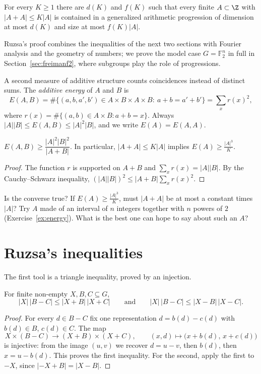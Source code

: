 \begin{theorem}\label{thm:freiman}
For every $K\ge1$ there are $d(K)$ and $f(K)$ such that every finite $A\subset\Z$ with $|A+A|\le K|A|$ is contained in a generalized arithmetic progression of dimension at most $d(K)$ and size at most $f(K)|A|$.
\end{theorem}

Ruzsa's proof combines the inequalities of the next two sections with Fourier analysis and the geometry of numbers; we prove the model case $G=\mathbb F_2^n$ in full in Section~\ref{sec:freimanf2}, where subgroups play the role of progressions.

A second measure of additive structure counts coincidences instead of distinct sums. The \emph{additive energy} of $A$ and $B$ is
\[
E(A,B)=\#\{(a,b,a',b')\in A\times B\times A\times B:\ a+b=a'+b'\}=\sum_xr(x)^2,
\]
where $r(x)=\#\{(a,b)\in A\times B:a+b=x\}$. Always $|A||B|\le E(A,B)\le|A|^2|B|$, and we write $E(A)=E(A,A)$.

\begin{lemma}\label{lem:energy}
$E(A,B)\ge\dfrac{|A|^2|B|^2}{|A+B|}$. In particular, $|A+A|\le K|A|$ implies $E(A)\ge\frac{|A|^3}K$.
\end{lemma}
\begin{proof}
The function $r$ is supported on $A+B$ and $\sum_xr(x)=|A||B|$. By the Cauchy--Schwarz inequality, $(|A||B|)^2\le|A+B|\sum_xr(x)^2$.
\end{proof}

\begin{think}
Is the converse true? If $E(A)\ge\frac{|A|^3}K$, must $|A+A|$ be at most a constant times $|A|$? Try $A$ made of an interval of $n$ integers together with $n$ powers of $2$ (Exercise~\ref{ex:energy}). What is the best one can hope to say about such an $A$?
\end{think}

\section{Ruzsa's inequalities}

The first tool is a triangle inequality, proved by an injection.

\begin{lemma}\label{lem:ruzsatri}
For finite non-empty $X,B,C\subseteq G$,
\[
|X|\,|B-C|\le|X+B|\,|X+C|\qquad\text{and}\qquad|X|\,|B-C|\le|X-B|\,|X-C|.
\]
\end{lemma}
\begin{proof}
For every $d\in B-C$ fix one representation $d=b(d)-c(d)$ with $b(d)\in B$, $c(d)\in C$. The map
\[
X\times(B-C)\to(X+B)\times(X+C),\qquad(x,d)\mapsto\bigl(x+b(d),\,x+c(d)\bigr)
\]
is injective: from the image $(u,v)$ we recover $d=u-v$, then $b(d)$, then $x=u-b(d)$. This proves the first inequality. For the second, apply the first to $-X$, since $|-X+B|=|X-B|$.
\end{proof}

